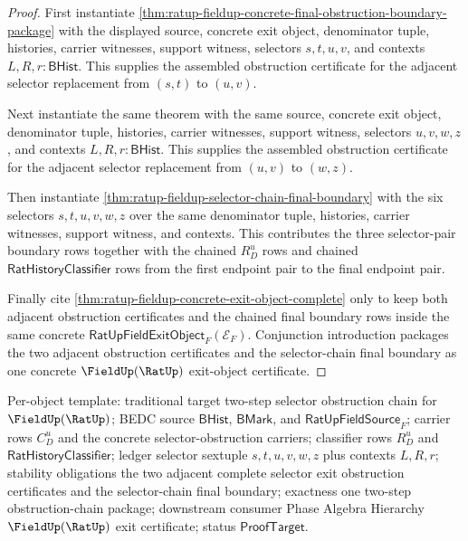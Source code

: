 \begin{proof}
First instantiate
\autoref{thm:ratup-fieldup-concrete-final-obstruction-boundary-package} with
the displayed source, concrete exit object, denominator tuple, histories,
carrier witnesses, support witness, selectors $s,t,u,v$, and contexts
$L,R,r:\mathsf{BHist}$. This supplies the assembled obstruction certificate for
the adjacent selector replacement from $(s,t)$ to $(u,v)$.

Next instantiate the same theorem with the same source, concrete exit object,
denominator tuple, histories, carrier witnesses, support witness, selectors
$u,v,w,z$, and contexts $L,R,r:\mathsf{BHist}$. This supplies the assembled
obstruction certificate for the adjacent selector replacement from $(u,v)$ to
$(w,z)$.

Then instantiate \autoref{thm:ratup-fieldup-selector-chain-final-boundary} with
the six selectors $s,t,u,v,w,z$ over the same denominator tuple, histories,
carrier witnesses, support witness, and contexts. This contributes the three
selector-pair boundary rows together with the chained $R_D^u$ rows and chained
$\mathsf{RatHistoryClassifier}$ rows from the first endpoint pair to the final
endpoint pair.

Finally cite \autoref{thm:ratup-fieldup-concrete-exit-object-complete} only to
keep both adjacent obstruction certificates and the chained final boundary rows
inside the same concrete $\mathsf{RatUpFieldExitObject}_F(\mathcal E_F)$.
Conjunction introduction packages the two adjacent obstruction certificates and
the selector-chain final boundary as one concrete
$\FieldUp(\RatUp)$ exit-object certificate.
\end{proof}

Per-object template: traditional target two-step selector obstruction chain for
$\FieldUp(\RatUp)$; BEDC source $\mathsf{BHist}$, $\mathsf{BMark}$, and
$\mathsf{RatUpFieldSource}_F$; carrier rows $C_D^u$ and the concrete
selector-obstruction carriers; classifier rows $R_D^u$ and
$\mathsf{RatHistoryClassifier}$; ledger selector sextuple $s,t,u,v,w,z$ plus
contexts $L,R,r$; stability obligations the two adjacent complete selector exit
obstruction certificates and the selector-chain final boundary; exactness one
two-step obstruction-chain package; downstream consumer Phase Algebra Hierarchy
$\FieldUp(\RatUp)$ exit certificate; status $\mathsf{ProofTarget}$.


